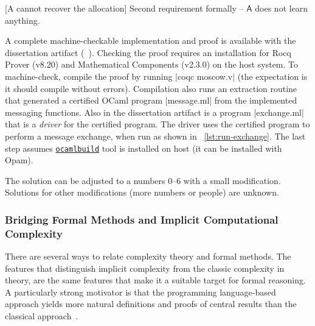 \begin{center}
\begin{minipage}{\textwidth}
\captionsetup{type=lstlisting}
[A cannot recover the allocation]{
Second requirement formally -- \(\mathsf{A}\) does not learn anything.}
\label{lst:lemma-2}
\end{minipage}
\end{center}

A complete machine-checkable implementation and proof is available with the dissertation artifact (\cf~).
Checking the proof requires an installation for Rocq Prover (v8.20) and Mathematical Components (v2.3.0) on the host system.
To machine-check, compile the proof by running \pr|coqc moscow.v| (the expectation is it should compile without errors).
Compilation also runs an extraction routine that generated a certified OCaml program \pr|message.ml| from the implemented messaging functions.
Also in the dissertation artifact is a program \pr|exchange.ml| that is a \emph{driver} for the certified program.
The driver uses the certified program to perform a message exchange, when run as shown in ~\autoref{lst:run-exchange}.
The last step assumes \href{https://github.com/ocaml/ocamlbuild}{\texttt{ocamlbuild}} tool is installed on host (it can be installed with Opam).

\begin{center}
\captionsetup{type=lstlisting}
\begin{minipage}{\textwidth}
\end{minipage}
\label{lst:run-exchange}
\end{center}

The solution can be adjusted to a numbers 0--6 with a small modification.
Solutions for other modifications (\eg more numbers or people) are unknown.

\subsubsection{Bridging Formal Methods and Implicit Computational Complexity}
\label{icc-formally}

There are several ways to relate complexity theory and formal methods.
The features that distinguish implicit complexity from the classic complexity in theory, are the same features that make it a suitable target for formal reasoning.
A particularly strong motivator is that the programming language-based approach yields more natural definitions and proofs of central results than the classical approach~\cite{kristiansen2017}.

